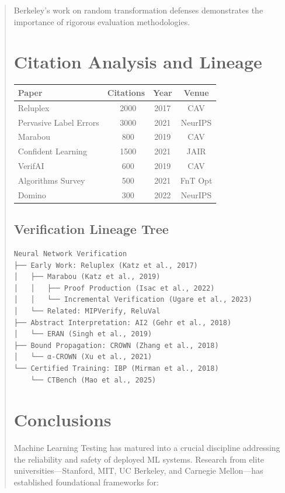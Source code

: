 \documentclass[12pt,a4paper]{article}
\begin{document}
\begin{abstract}
Berkeley's work on random transformation defenses demonstrates the importance of rigorous evaluation methodologies.

\section{Citation Analysis and Lineage}

\begin{table}[h]
\centering
\begin{tabular}{|l|c|c|c|}
\hline
Paper & Citations & Year & Venue \\
\hline
Reluplex & ~2000 & 2017 & CAV \\
Pervasive Label Errors & ~3000 & 2021 & NeurIPS \\
Marabou & ~800 & 2019 & CAV \\
Confident Learning & ~1500 & 2021 & JAIR \\
VerifAI & ~600 & 2019 & CAV \\
Algorithms Survey & ~500 & 2021 & FnT Opt \\
Domino & ~300 & 2022 & NeurIPS \\
\hline
\end{tabular}
\end{table}

\subsection{Verification Lineage Tree}

\begin{verbatim}
Neural Network Verification
├── Early Work: Reluplex (Katz et al., 2017)
│   ├── Marabou (Katz et al., 2019)
│   │   ├── Proof Production (Isac et al., 2022)
│   │   └── Incremental Verification (Ugare et al., 2023)
│   └── Related: MIPVerify, ReluVal
├── Abstract Interpretation: AI2 (Gehr et al., 2018)
│   └── ERAN (Singh et al., 2019)
├── Bound Propagation: CROWN (Zhang et al., 2018)
│   └── α-CROWN (Xu et al., 2021)
└── Certified Training: IBP (Mirman et al., 2018)
    └── CTBench (Mao et al., 2025)
\end{verbatim}

\section{Conclusions}

Machine Learning Testing has matured into a crucial discipline addressing the reliability and safety of deployed ML systems. Research from elite universities—Stanford, MIT, UC Berkeley, and Carnegie Mellon—has established foundational frameworks for:


\end{abstract}
\end{document}
